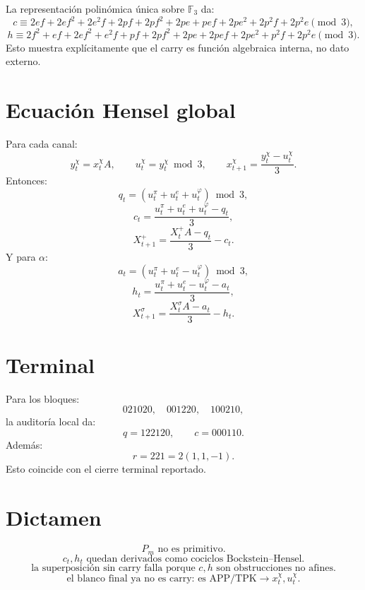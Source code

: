 \documentclass[11pt,a4paper]{article}
\begin{document}
La representación polinómica única sobre \(\mathbb F_3\) da:
\[
c\equiv 2ef + 2ef^2 + 2e^2f + 2pf + 2pf^2 + 2pe + pef + 2pe^2 + 2p^2f + 2p^2e\pmod3,
\]
\[
h\equiv 2f^2 + ef + 2ef^2 + e^2f + pf + 2pf^2 + 2pe + 2pef + 2pe^2 + p^2f + 2p^2e\pmod3.
\]
Esto muestra explícitamente que el carry es función algebraica interna, no dato externo.

\section{Ecuación Hensel global}

Para cada canal:
\[
y_t^\chi=x_t^\chi A,
\qquad
u_t^\chi=y_t^\chi\bmod3,
\qquad
x_{t+1}^\chi=\frac{y_t^\chi-u_t^\chi}{3}.
\]
Entonces:
\[
q_t=(u_t^\pi+u_t^e+u_t^\varphi)\bmod3,
\]
\[
c_t=\frac{u_t^\pi+u_t^e+u_t^\varphi-q_t}{3},
\]
\[
\boxed{
X_{t+1}^+
=
\frac{X_t^+A-q_t}{3}-c_t.
}
\]
Y para \(\alpha\):
\[
a_t=(u_t^\pi+u_t^e-u_t^\varphi)\bmod3,
\]
\[
h_t=\frac{u_t^\pi+u_t^e-u_t^\varphi-a_t}{3},
\]
\[
\boxed{
X_{t+1}^\sigma
=
\frac{X_t^\sigma A-a_t}{3}-h_t.
}
\]

\section{Terminal}

Para los bloques:
\[
021020,\quad001220,\quad100210,
\]
la auditoría local da:
\[
q=122120,
\qquad
c=000110.
\]
Además:
\[
r=221=2(1,1,-1).
\]
Esto coincide con el cierre terminal reportado.

\section{Dictamen}

\[
\boxed{
P_m\text{ no es primitivo.}
}
\]
\[
\boxed{
c_t,h_t\text{ quedan derivados como cociclos Bockstein--Hensel.}
}
\]
\[
\boxed{
\text{la superposición sin carry falla porque }c,h\text{ son obstrucciones no afines.}
}
\]
\[
\boxed{
\text{el blanco final ya no es carry: es APP/TPK}\to x_t^\chi,u_t^\chi.
}
\]
\end{document}
